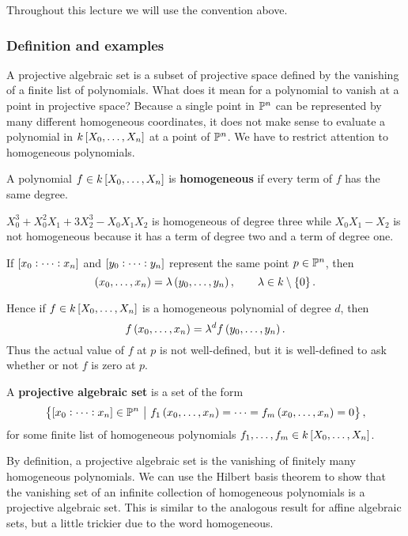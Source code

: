 Throughout this lecture we will use the convention above.

\subsubsection{Definition and examples}

A projective algebraic set is a subset of projective space defined by the vanishing of a finite list of polynomials. What does it mean for a polynomial to vanish at a point in projective space? Because a single point in $ \mathbb{P}^n $ can be represented by many different homogeneous coordinates, it does not make sense to evaluate a polynomial in $ k\sbr{X_0, \dots, X_n} $ at a point of $ \mathbb{P}^n $. We have to restrict attention to homogeneous polynomials.

\begin{definition*}
A polynomial $ f \in k\sbr{X_0, \dots, X_n} $ is \textbf{homogeneous} if every term of $ f $ has the same degree.
\end{definition*}

\begin{example*}
$ X_0^3 + X_0^2X_1 + 3X_2^3 - X_0X_1X_2 $ is homogeneous of degree three while $ X_0X_1 - X_2 $ is not homogeneous because it has a term of degree two and a term of degree one.
\end{example*}

If $ \sbr{x_0 : \dots : x_n} $ and $ \sbr{y_0 : \dots : y_n} $ represent the same point $ p \in \mathbb{P}^n $, then
$$ \br{x_0, \dots, x_n} = \lambda\br{y_0, \dots, y_n}, \qquad \lambda \in k \setminus \cbr{0}. $$

\pagebreak

Hence if $ f \in k\sbr{X_0, \dots, X_n} $ is a homogeneous polynomial of degree $ d $, then
$$ f\br{x_0, \dots, x_n} = \lambda^df\br{y_0, \dots, y_n}. $$
Thus the actual value of $ f $ at $ p $ is not well-defined, but it is well-defined to ask whether or not $ f $ is zero at $ p $.

\begin{definition*}
A \textbf{projective algebraic set} is a set of the form
$$ \cbr{\sbr{x_0 : \dots : x_n} \in \PP^n \st f_1\br{x_0, \dots, x_n} = \dots = f_m\br{x_0, \dots, x_n} = 0}, $$
for some finite list of homogeneous polynomials $ f_1, \dots, f_m \in k\sbr{X_0, \dots, X_n} $.
\end{definition*}

By definition, a projective algebraic set is the vanishing of finitely many homogeneous polynomials. We can use the Hilbert basis theorem to show that the vanishing set of an infinite collection of homogeneous polynomials is a projective algebraic set. This is similar to the analogous result for affine algebraic sets, but a little trickier due to the word homogeneous.

